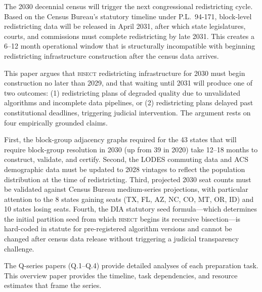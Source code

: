 The 2030 decennial census will trigger the next congressional redistricting cycle.
Based on the Census Bureau's statutory timeline under P.L.\ 94-171, block-level
redistricting data will be released in April 2031, after which state legislatures,
courts, and commissions must complete redistricting by late 2031. This creates
a 6--12 month operational window that is structurally incompatible with beginning
redistricting infrastructure construction after the census data arrives.

This paper argues that \textsc{bisect} redistricting infrastructure for 2030 must
begin construction no later than 2029, and that waiting until 2031 will produce
one of two outcomes: (1) redistricting plans of degraded quality due to unvalidated
algorithms and incomplete data pipelines, or (2) redistricting plans delayed past
constitutional deadlines, triggering judicial intervention. The argument rests on
four empirically grounded claims.

First, the block-group adjacency graphs required for the 43 states that will require
block-group resolution in 2030 (up from 39 in 2020) take 12--18 months to construct,
validate, and certify. Second, the LODES commuting data and ACS demographic data
must be updated to 2028 vintages to reflect the population distribution at the time
of redistricting. Third, projected 2030 seat counts must be validated against
Census Bureau medium-series projections, with particular attention to the 8 states
gaining seats (TX, FL, AZ, NC, CO, MT, OR, ID) and 10 states losing seats. Fourth,
the DIA statutory seed formula---which determines the initial partition seed from
which \textsc{bisect} begins its recursive bisection---is hard-coded in statute for
pre-registered algorithm versions and cannot be changed after census data release
without triggering a judicial transparency challenge.

The Q-series papers (Q.1--Q.4) provide detailed analyses of each preparation task.
This overview paper provides the timeline, task dependencies, and resource estimates
that frame the series.
